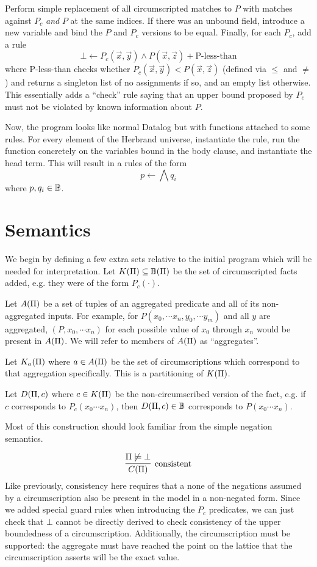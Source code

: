 Perform simple replacement of all circumscripted matches to $P$ with matches against $P_c$ \emph{and} $P$ at the same indices.
If there was an unbound field, introduce a new variable and bind the $P$ and $P_c$ versions to be equal.
Finally, for each $P_c$, add a rule
\[
	\bot \leftarrow P_c(\vec{x}, \vec{y}) \wedge P(\vec{x}, \vec{z}) + \textrm{P-less-than}
\]
where P-less-than checks whether $P_c(\vec{x}, \vec{y}) < P(\vec{x}, \vec{z})$ (defined via $\leq$ and $\neq$) and returns a singleton list of no assignments if so, and an empty list otherwise.
This essentially adds a ``check'' rule saying that an upper bound proposed by $P_c$ must not be violated by known information about $P$.

Now, the program looks like normal Datalog but with functions attached to some rules.
For every element of the Herbrand universe, instantiate the rule, run the function concretely on the variables bound in the body clause, and instantiate the head term.
This will result in a rules of the form
\[
	p \leftarrow \bigwedge q_i
\]
where $p, q_i \in \mathbb{B}$.

\section{Semantics}
\label{formal:sec:semantics}
We begin by defining a few extra sets relative to the initial program which will be needed for interpretation.
Let $K(\Pi) \subseteq \mathbb{B}(\Pi)$ be the set of circumscripted facts added, e.g. they were of the form $P_c(\cdot)$.

Let $A(\Pi)$ be a set of tuples of an aggregated predicate and all of its non-aggregated inputs.
For example, for $P(x_0, \cdots x_n, y_0, \cdots y_m)$ and all $y$ are aggregated, $(P, x_0, \cdots x_n)$ for each possible value of $x_0$ through $x_n$ would be present in $A(\Pi)$.
We will refer to members of $A(\Pi)$ as ``aggregates''.

Let $K_a(\Pi)$ where $a \in A(\Pi)$ be the set of circumscriptions which correspond to that aggregation specifically.
This is a partitioning of $K(\Pi)$.

Let $D(\Pi, c)$ where $c \in K(\Pi)$ be the non-circumscribed version of the fact, e.g. if $c$ corresponds to $P_c(x_0 \cdots x_n)$, then $D(\Pi, c) \in \mathbb{B}$ corresponds to $P(x_0 \cdots x_n)$.

Most of this construction should look familiar from the simple negation semantics.

\[
	\infer[\textrm{consistent}]{\cons{\Pi}}{\Pi \not \models \bot}
\]
Like previously, consistency here requires that a none of the negations assumed by a circumscription also be present in the model in a non-negated form.
Since we added special guard rules when introducing the $P_c$ predicates, we can just check that $\bot$ cannot be directly derived to check consistency of the upper boundedness of a circumscription.
Additionally, the circumscription must be supported: the aggregate must have reached the point on the lattice that the circumscription asserts will be the exact value.

